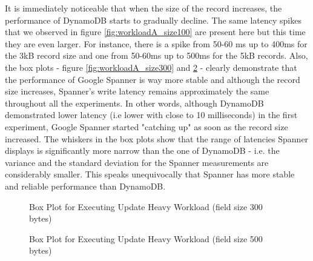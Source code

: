 \documentclass[letterpaper, 10 pt, conference]{ieeeconf}  %
\begin{document}
It is immediately noticeable that when the size of the record increases, the performance of DynamoDB starts to gradually decline. The same latency spikes that we observed in figure \ref{fig:workloadA_size100} are present here but this time they are even larger. For instance, there is a spike from 50-60 ms up to 400ms for the 3kB record size and one from 50-60ms up to 500ms for the 5kB records. Also, the box plots - figure \ref{fig:workloadA_size300} and \ref{fig:boxplot_size500} - clearly demonstrate that the performance of Google Spanner is way more stable and although the record size increases, Spanner's write latency remains approximately the same throughout all the experiments. In other words, although DynamoDB demonstrated lower latency (i.e lower with close to 10 milliseconds) in the first experiment, Google Spanner started "catching up" as soon as the record size increased. The whiskers in the box plots show that the range of latencies Spanner displays is significantly more narrow than the one of DynamoDB - i.e. the variance and the standard deviation for the Spanner measurements are considerably smaller. This speaks unequivocally that Spanner has more stable and reliable performance than DynamoDB. 

\begin{figure}[h]
\centering
{}
\caption{Box Plot for Executing Update Heavy Workload (field size 300 bytes)}
\label{fig:boxplot_size300}
\end{figure} 
 
\begin{figure}[h]
\centering
{}
\caption{Box Plot for Executing Update Heavy Workload (field size 500 bytes)}
\label{fig:boxplot_size500}
\end{figure} 
\end{document}
